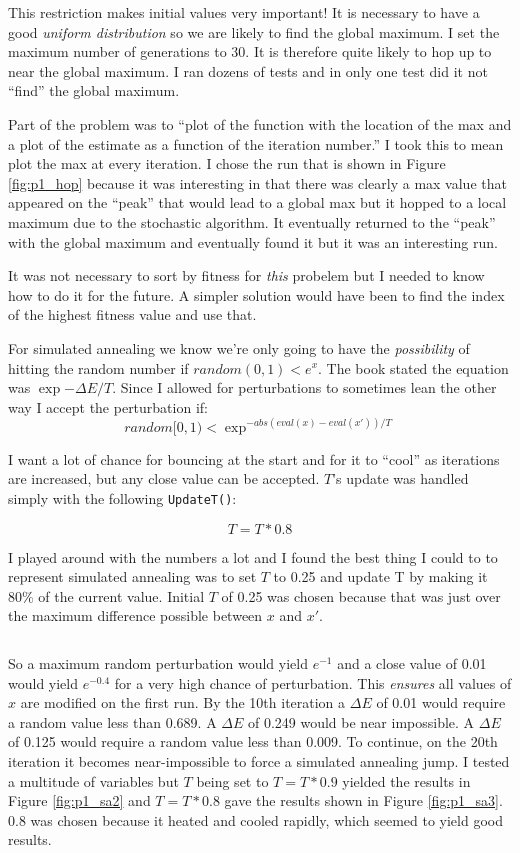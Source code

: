 \documentclass[12pt]{article}
\begin{document}
$$$$
This restriction makes initial values very important! It is necessary to have a 
good \textit{uniform distribution} so we are likely to find the global maximum. 
I set the maximum number of generations to 30. It is therefore quite likely 
to hop up to near the global maximum. I ran dozens of tests and in only one test 
did it not ``find'' the global maximum. 

$$$$
Part of the problem was to ``plot of the function with the location of the max 
and a plot of the estimate as a function of the iteration number.'' I took this 
to mean plot the max at every iteration. I chose the run that is shown in Figure 
\ref{fig:p1_hop} because it was interesting in that there was clearly a max 
value that appeared on the ``peak'' that would lead to a global max but it 
hopped to a local maximum due to the stochastic algorithm. It eventually 
returned to the ``peak'' with the global maximum and eventually found it but it 
was an interesting run.

$$$$
It was not necessary to sort by fitness for \textit{this} probelem but I needed 
to know how to do it for the future. A simpler solution would have been to find 
the index of the highest fitness value and use that.

$$$$
For simulated annealing we know we're only going to have the \textit{possibility} 
of hitting the random number if $random(0, 1) < e^x$. The book stated the 
equation was $\exp{-\Delta E/T}$. Since I allowed for perturbations to sometimes 
lean the other way I accept the perturbation if:
$$
random[0, 1) < \exp^{-abs(eval(x) - eval(x')) / T}
$$

I want a lot of chance for bouncing at the start and for it to ``cool'' as 
iterations are increased, but any close value can be accepted. $T$'s update was 
handled simply with the following \texttt{UpdateT()}:

$$
T = T * 0.8
$$

I played around with the numbers a lot and I found the best thing I could to to 
represent simulated annealing was to set $T$ to 0.25 and update T by making it 
$80\%$ of the current value. Initial $T$ of 0.25 was chosen because that was 
just over the maximum difference possible between $x$ and $x'$. 

$$$$

So a maximum 
random perturbation would yield $e^{-1}$ and a close value of 0.01 would yield 
$e^{-0.4}$ for a very high chance of perturbation. This \textit{ensures} all 
values of $x$ are modified on the first run. By the 10th iteration a $\Delta E$ of 
0.01 would require a random value less than 0.689. A $\Delta E$ of 0.249 would be 
near impossible. A $\Delta E$ of 0.125 would require a random value less than 
0.009. To continue, on the 20th iteration it becomes near-impossible to force a 
simulated annealing jump. I tested a multitude of variables but $T$ being set to 
$T=T*0.9$ yielded the results in Figure \ref{fig:p1_sa2} and $T=T*0.8$ gave the 
results shown in Figure \ref{fig:p1_sa3}. 0.8 was chosen because it heated and 
cooled rapidly, which seemed to yield good results. 
\end{document}
